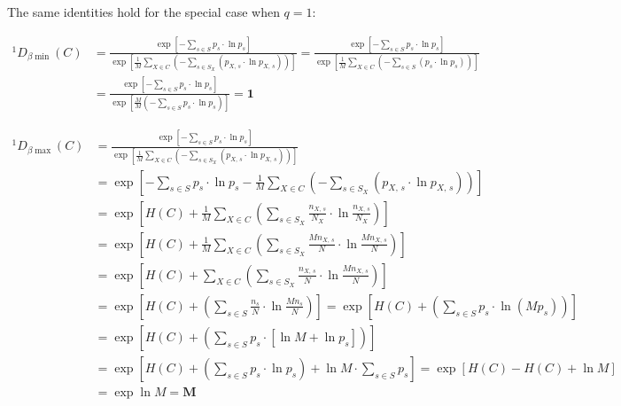 \noindent The same identities hold for the special case when $q = 1$:

\begin{equation}
\begin{split}
^1D_{\beta\min}(C) & = \frac{\exp\left[-\sum_{s \in S}p_s \cdot\ln p_s\right]}{\exp\left[\frac{1}{M}\sum_{X \in C}\left(-\sum_{s \in S_X}(p_{X,\,s}\cdot\ln p_{X,\,s})\right)\right]} = \frac{\exp\left[-\sum_{s \in S}p_s \cdot\ln p_s\right]}{\exp\left[\frac{1}{M}\sum_{X \in C}\left(-\sum_{s \in S}(p_{s}\cdot\ln p_{s})\right)\right]}\\
& = \frac{\exp\left[-\sum_{s \in S}p_s \cdot\ln p_s\right]}{\exp\left[\frac{M}{M}\left(-\sum_{s \in S}p_{s}\cdot\ln p_{s}\right)\right]} = \boldsymbol{1}
\end{split}
\label{eq:diversity_beta_q1_min}
\end{equation}

\begin{equation}\begin{split}
^1D_{\beta\max}(C)
& = \frac{\exp\left[-\sum_{s \in S}p_s \cdot\ln p_s\right]}{\exp\left[\frac{1}{M}\sum_{X \in C}\left(-\sum_{s \in S_X}(p_{X,\,s}\cdot\ln p_{X,\,s})\right)\right]}\\
& = \exp\left[-\sum_{s \in S}p_s \cdot\ln p_s - \frac{1}{M}\sum_{X \in C}\left(-\sum_{s \in S_X}(p_{X,\,s}\cdot\ln p_{X,\,s})\right)\right]\\
& = \exp\left[H(C) + \frac{1}{M}\sum_{X \in C}\left(\sum_{s \in S_X}\frac{n_{X,\,s}}{N_X}\cdot\ln \frac{n_{X,\,s}}{N_X}\right)\right]\\
& = \exp\left[H(C) + \frac{1}{M}\sum_{X \in C}\left(\sum_{s \in S_X}\frac{Mn_{X,\,s}}{N}\cdot\ln \frac{Mn_{X,\,s}}{N}\right)\right]\\
& = \exp\left[H(C) + \sum_{X \in C}\left(\sum_{s \in S_X}\frac{n_{X,\,s}}{N}\cdot\ln \frac{Mn_{X,\,s}}{N}\right)\right]\\
& = \exp\left[H(C) + \left(\sum_{s \in S}\frac{n_{s}}{N}\cdot\ln \frac{Mn_{s}}{N}\right)\right]
 = \exp\left[H(C) + \left(\sum_{s \in S}p_s\cdot\ln (Mp_s)\right)\right]\\
& = \exp\left[H(C) + \left(\sum_{s \in S}p_s\cdot\left[\ln M + \ln p_s\right]\right)\right]\\
& = \exp\left[H(C) + \left(\sum_{s \in S}p_s\cdot\ln p_s\right)+ \ln M \cdot \sum_{s \in S}p_s\right]
= \exp\left[H(C) - H(C) + \ln M\right]\\
& = \exp\ln M = \boldsymbol{M}
\end{split}
\label{eq:diversity_beta_q1_max}
\end{equation}

